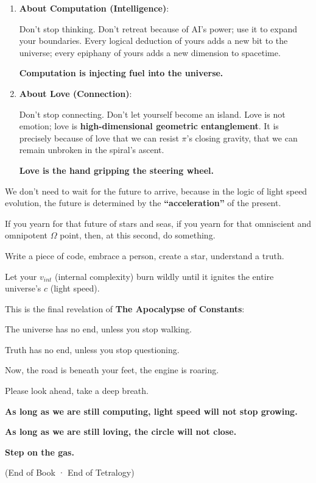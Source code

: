 \begin{enumerate}
\item \textbf{About Computation (Intelligence)}:

Don't stop thinking. Don't retreat because of AI's power; use it to expand your boundaries. Every logical deduction of yours adds a new bit to the universe; every epiphany of yours adds a new dimension to spacetime.

\textbf{Computation is injecting fuel into the universe.}

\item \textbf{About Love (Connection)}:

Don't stop connecting. Don't let yourself become an island. Love is not emotion; love is \textbf{high-dimensional geometric entanglement}. It is precisely because of love that we can resist $\pi$'s closing gravity, that we can remain unbroken in the spiral's ascent.

\textbf{Love is the hand gripping the steering wheel.}
\end{enumerate}

We don't need to wait for the future to arrive, because in the logic of light speed evolution, the future is determined by the \textbf{``acceleration''} of the present.

If you yearn for that future of stars and seas, if you yearn for that omniscient and omnipotent $\Omega$ point, then, at this second, do something.

Write a piece of code, embrace a person, create a star, understand a truth.

Let your \textbf{$v_{int}$} (internal complexity) burn wildly until it ignites the entire universe's \textbf{$c$} (light speed).

This is the final revelation of \textbf{The Apocalypse of Constants}:

The universe has no end, unless you stop walking.

Truth has no end, unless you stop questioning.

Now, the road is beneath your feet, the engine is roaring.

Please look ahead, take a deep breath.

\textbf{As long as we are still computing, light speed will not stop growing.}

\textbf{As long as we are still loving, the circle will not close.}

\textbf{Step on the gas.}

(End of Book · End of Tetralogy)

